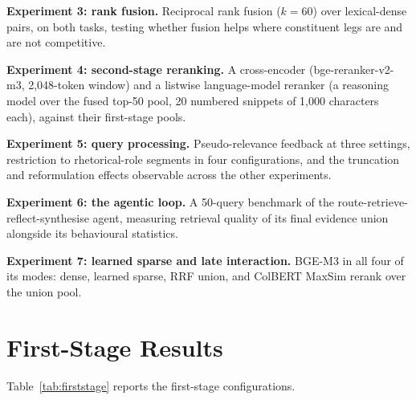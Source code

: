 \documentclass{mnnit}
\begin{document}
\noindent\textbf{Experiment 3: rank fusion.} Reciprocal rank
fusion ($k=60$) over lexical-dense pairs, on both tasks, testing
whether fusion helps where constituent legs are and are not
competitive.

\noindent\textbf{Experiment 4: second-stage reranking.} A
cross-encoder (bge-reranker-v2-m3, 2,048-token window) and a
listwise language-model reranker (a reasoning model over the
fused top-50 pool, 20 numbered snippets of 1,000 characters
each), against their first-stage pools.

\noindent\textbf{Experiment 5: query processing.}
Pseudo-relevance feedback at three settings, restriction to
rhetorical-role segments in four configurations, and the
truncation and reformulation effects observable across the other
experiments.

\noindent\textbf{Experiment 6: the agentic loop.} A 50-query
benchmark of the route-retrieve-reflect-synthesise agent,
measuring retrieval quality of its final evidence union alongside
its behavioural statistics.

\noindent\textbf{Experiment 7: learned sparse and late
interaction.} BGE-M3 in all four of its modes: dense, learned
sparse, RRF union, and ColBERT MaxSim rerank over the union pool.

\section{First-Stage Results}
Table~\ref{tab:firststage} reports the first-stage
configurations.
\end{document}
